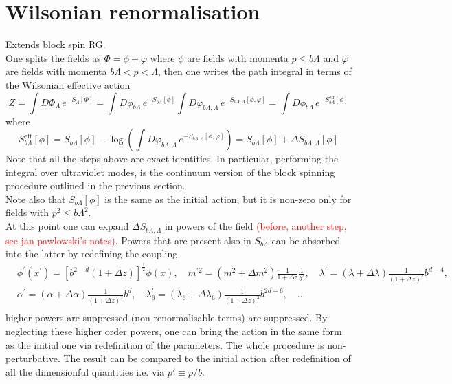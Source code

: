 \section{Wilsonian renormalisation}
\label{sec:wilson_rg}
Extends block spin RG. \\
One splits the fields as $\Phi = \phi + \varphi$ where $\phi$ are fields with momenta $p \leq b\Lambda$ and $\varphi$ are fields with momenta $b\Lambda < p < \Lambda$, then one writes the path integral in terms of the Wilsonian effective action
\begin{equation*}
    Z = \int D\Phi_\Lambda \, e^{-S_\Lambda[\Phi]} = \int D\phi_{b\Lambda} \, e^{-S_{b\Lambda}[\phi]} \int D\varphi_{b\Lambda, \Lambda}  \, e^{-S_{b\Lambda, \Lambda}[\phi, \varphi]} = \int D\phi_{b\Lambda} \, e^{-S_{b\Lambda}^\text{eff}[\phi]}
\end{equation*}
where 
\begin{equation*}
    S_{b\Lambda}^\text{eff}[\phi] = S_{b\Lambda}[\phi] - \log\left( \int D\varphi_{b\Lambda, \Lambda}  \, e^{-S_{b\Lambda, \Lambda}[\phi, \varphi]}\right) =  S_{b\Lambda}[\phi] + \Delta S_{b\Lambda, \Lambda}[\phi]
\end{equation*}
Note that all the steps above are exact identities. In particular, performing the integral over ultraviolet modes, is the continuum version of the block spinning procedure outlined in the previous section. \\
Note also that $S_{b\Lambda}[\phi]$ is the same as the initial action, but it is non-zero only for fields with $p^2 \leq b\Lambda^2$. \\
At this point one can expand $\Delta S_{b\Lambda, \Lambda}$ in powers of the field \textcolor{red}{(before, another step, see jan pawlowski's notes)}. Powers that are present also in $S_{b\Lambda}$ can be absorbed into the latter by redefining the coupling
\begin{equation}
\begin{aligned}
& \phi^{\prime}\left(x^{\prime}\right)=\left[b^{2-d}(1+\Delta z)\right]^{\frac{1}{2}} \phi(x), \quad m^{\prime 2}=\left(m^2+\Delta m^2\right) \frac{1}{1+\Delta z} \frac{1}{b^2}, \quad \lambda^{\prime}=(\lambda+\Delta \lambda) \frac{1}{(1+\Delta z)^2} b^{d-4}, \\
& \alpha^{\prime}=(\alpha+\Delta \alpha) \frac{1}{(1+\Delta z)^2} b^d, \quad \lambda_6^{\prime}=\left(\lambda_6+\Delta \lambda_6\right) \frac{1}{(1+\Delta z)^3} b^{2 d-6}, \quad \ldots \\
&
\end{aligned}
\end{equation}
higher powers are suppressed (non-renormalisable terms) are suppressed. By neglecting these higher order powers, one can bring the action in the same form as the initial one via redefinition of the parameters. The whole procedure is non-perturbative. The result can be compared to the initial action after redefinition of all the dimensionful quantities i.e. via $p'\equiv p/b$. 

